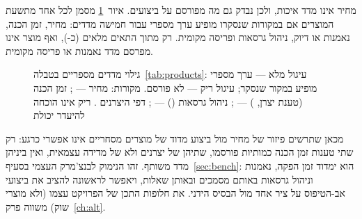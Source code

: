 מחיר אינו מדד איכות, ולכן נבדק גם מה מפורסם על ביצועים. איור~\ref{fig:disclosure} מסמן לכל אחד מתשעת המוצרים אם
במקורות שנסקרו מופיע ערך מספרי עבור חמישה מדדים: מחיר, זמן הכנה, נאמנות או דיוק, ניהול גרסאות ופריסה מקומית.
רק  מתוך  התאים מלאים (כ-), ואף מוצר אינו מפרסם מדד נאמנות או פריסה מקומית.
\begin{figure}[!htbp]
\centering
{}
\caption[גילוי מדדים מספריים בידי המוצרים]{גילוי מדדים מספריים בטבלה~\ref{tab:products}: עיגול מלא --- ערך מספרי מופיע במקור שנסקר; עיגול ריק --- לא פורסם. מקורות: מחיר --- \cite{manualto2026pricing,g2dozuki}; זמן הכנה (טענת יצרן, ) --- \cite{manualto2026best}; ניהול גרסאות () --- \cite{manualto2026best}; דפי היצרנים \cite{poka,glean,guru,vuforia,microsoftguides}. ריק אינו הוכחה להיעדר יכולת}\label{fig:disclosure}
\end{figure}
מכאן שתרשים פיזור של מחיר מול ביצוע מדוד של מוצרים מסחריים אינו אפשרי כרגע: רק שתי טענות זמן הכנה כמותיות פורסמו, שתיהן של
יצרנים ולא של מדידה עצמאית, ואין ביניהן מדד משותף. זהו הנימוק לבנצ'מרק העצמי בסעיף~\ref{sec:bench}: הוא ימדוד זמן הפקה, נאמנות
וניהול גרסאות באותם מסמכים ובאותן שאלות, ויאפשר לראשונה להציב את ביצועי אב-הטיפוס על ציר אחד מול הבסיס הידני.
את חלופות התכן של הפרויקט עצמו (ולא מוצרי שוק) משווה פרק~\ref{ch:alt}.

